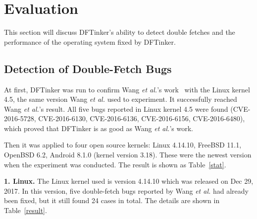 \documentclass[10pt]{llncs}
\begin{document}
\section{Evaluation}%
\label{evalue}
This section will discuss DFTinker's ability to detect double fetches and the performance of the operating system fixed by DFTinker.
\subsection{Detection of Double-Fetch Bugs}
\label{evalue1}


At first, DFTinker was run to confirm Wang \textit{et al.}'s work~\cite{wang} with the Linux kernel 4.5, the same version Wang \textit{et al.} used to experiment. It successfully reached Wang \textit{et al.}'s result. All five bugs reported in Linux kernel 4.5 were found (CVE-2016-5728, CVE-2016-6130, CVE-2016-6136, CVE-2016-6156, CVE-2016-6480), which proved that DFTinker is as good as Wang \textit{et al.}'s work.

Then it was applied to four open source kernels: Linux 4.14.10, FreeBSD 11.1, OpenBSD 6.2, Android 8.1.0 (kernel version 3.18). These were the newest version when the experiment was conducted. The result is shown as Table~\ref{stat}.

\textbf{1. Linux.} The Linux kernel used is version 4.14.10 which was released on Dec 29, 2017. In this version, five double-fetch bugs reported by Wang \textit{et al.} had already been fixed, but it still found 24 cases in total. The details are shown in Table~\ref{result}.
\end{document}
